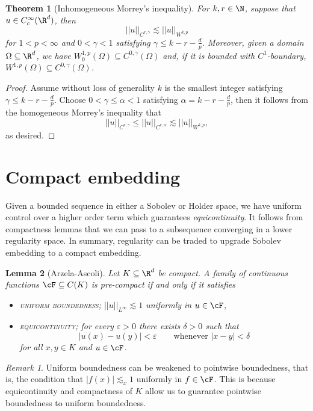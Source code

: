 \documentclass[reqno]{amsart}
\newtheorem{theorem}{Theorem}
\newtheorem{lemma}[theorem]{Lemma}
\theoremstyle{definition}
\theoremstyle{remark}
\newtheorem*{remark}{Remark}
\renewcommand{\epsilon}{\varepsilon}
\renewcommand{\emph}{\textsc}
\begin{document}
\begin{theorem}[Inhomogeneous Morrey's inequality]
	For $k, r \in \N$, suppose that $u \in C^\infty_c (\R^d)$, then 
		\[ ||u||_{C^{r, \gamma}} \lesssim ||u||_{W^{k, p}} \]
	for $1 < p < \infty$ and $0 < \gamma < 1$ satisfying $\gamma \leq k - r - \tfrac{d}{p}$. Moreover, given a domain $\Omega \subseteq \R^d$, we have $W^{1, p}_0 (\Omega) \subseteq C^{0, \gamma} (\Omega)$ and, if it is bounded with $C^1$-boundary, $W^{1, p} (\Omega) \subseteq C^{0, \gamma} (\Omega)$.
\end{theorem}

\begin{proof}
	Assume without loss of generality $k$ is the smallest integer satisfying $\gamma \leq k - r - \tfrac{d}{p}$. Choose $0 < \gamma \leq \alpha < 1$ satisfying $\alpha = k - r - \tfrac{d}{p}$, then it follows from the homogeneous Morrey's inequality that
		\[ ||u||_{C^{r, \gamma}} \leq ||u||_{C^{r, \alpha}} \lesssim ||u||_{W^{k, p}}, \]
	as desired. 	
\end{proof}


\section{Compact embedding}

Given a bounded sequence in either a Sobolev or Holder space, we have uniform control over a higher order term which guarantees \textit{equicontinuity}. It follows from compactness lemmas that we can pass to a subsequence converging in a lower regularity space. In summary, regularity can be traded to upgrade Sobolev embedding to a compact embedding. 

\begin{lemma}[Arzela-Ascoli]
	Let $K \subseteq \R^d$ be compact. A family of continuous functions $\cF \subseteq C(K)$ is pre-compact if and only if it satisfies
	\begin{itemize}
		\item \emph{uniform boundedness}; $||u||_{L^\infty} \lesssim 1$ uniformly in $u \in \cF$, 
		\item \emph{equicontinuity}; for every $\epsilon > 0$ there exists $\delta > 0$ such that 
					\[ |u (x) - u (y)| < \epsilon \qquad \text{whenever } |x - y| < \delta \]
				for all $x, y \in K$ and $u \in \cF$. 	
	\end{itemize}
\end{lemma}

\begin{remark}
	Uniform boundedness can be weakened to pointwise boundedness, that is, the condition that $|f(x)| \lesssim_x 1$ uniformly in $f \in \cF$. This is because equicontinuity and compactness of $K$ allow us to guarantee pointwise boundedness to uniform boundedness. 
\end{remark}
\end{document}
